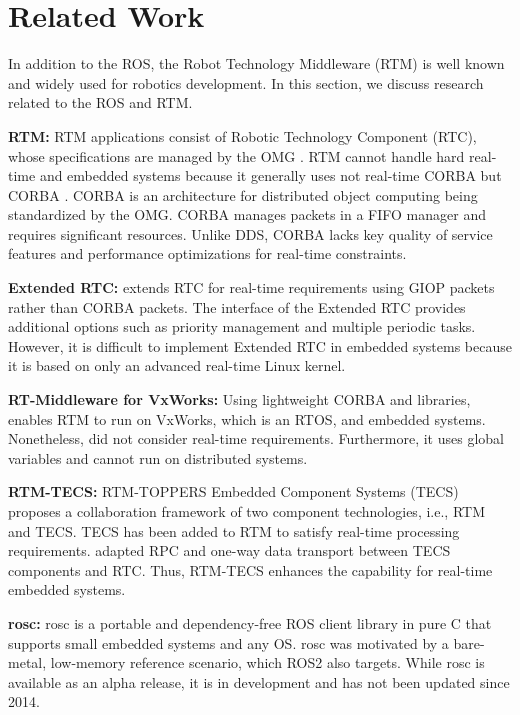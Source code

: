 \documentclass{sig-alternate-05-2015}
\begin{document}
\section{Related Work}
\label{sec:orgheadline3}

In addition to the ROS, the Robot Technology Middleware (RTM) \cite{ando2005rt} is well known and widely used for robotics development. 
In this section, we discuss research related to the ROS and RTM.

\textbf{RTM:} 
RTM applications consist of Robotic Technology Component (RTC), whose specifications are managed by the OMG \cite{omg}. 
RTM cannot handle hard real-time and embedded systems because it generally uses not real-time CORBA \cite{schmidt1998design} but CORBA \cite{vinoski1997corba} \cite{corba3.3}.
CORBA is an architecture for distributed object computing being standardized by the OMG.
CORBA manages packets in a FIFO manager and requires significant resources. 
Unlike DDS, CORBA lacks key quality of service features and performance optimizations for real-time constraints.

\textbf{Extended RTC:} 
\cite{chishiro2009extended} extends RTC for real-time requirements using GIOP packets rather than CORBA packets.
The interface of the Extended RTC provides additional options such as priority management and multiple periodic tasks. 
However, it is difficult to implement Extended RTC in embedded systems because it is based on only an advanced real-time Linux kernel.

\textbf{RT-Middleware for VxWorks:} 
Using lightweight CORBA and libraries, \cite{ikezoeopenrt} enables RTM to run on VxWorks, which is an RTOS, and embedded systems.
Nonetheless,  \cite{ikezoeopenrt} did not consider real-time requirements. 
Furthermore, it uses global variables and cannot run on distributed systems.

\textbf{RTM-TECS:} RTM-TOPPERS Embedded Component Systems (TECS) \cite{rtmtecs2016} proposes a collaboration framework of two component technologies, i.e., RTM and TECS. 
TECS \cite{azumi2015mruby} has been added to RTM to satisfy real-time processing requirements. 
\cite{rtmtecs2016} adapted RPC and one-way data transport between TECS components and RTC. 
Thus, RTM-TECS enhances the capability for real-time embedded systems.

\textbf{rosc:} 
rosc \cite{rosc@roscon2013} is a portable and dependency-free ROS client library in pure C that supports small embedded systems and any OS. rosc was motivated by a bare-metal, low-memory reference scenario, which ROS2 also targets. While rosc is available as an alpha release, it is in development and has not been updated since 2014.
\end{document}

